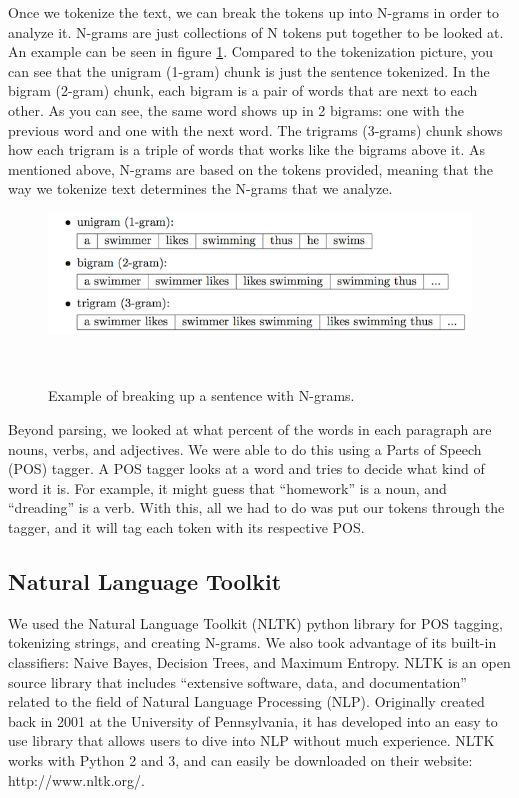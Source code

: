 Once we tokenize the text, we can break the tokens up into N-grams in order to analyze it. N-grams are just collections of N tokens put together to be looked at. An example can be seen in figure \ref{fig:ngrams}. Compared to the tokenization picture, you can see that the unigram (1-gram) chunk is just the sentence tokenized. In the bigram (2-gram) chunk, each bigram is a pair of words that are next to each other. As you can see, the same word shows up in 2 bigrams: one with the previous word and one with the next word. The trigrams (3-grams) chunk shows how each trigram is a triple of words that works like the bigrams above it. As mentioned above, N-grams are based on the tokens provided, meaning that the way we tokenize text determines the N-grams that we analyze.

\begin{figure}
\centering
\includegraphics[width=.7\columnwidth]{figures/ngram}
  \caption{Example of breaking up a sentence with N-grams. \cite{ngrams}}~\label{fig:ngrams}
\end{figure}

Beyond parsing, we looked at what percent of the words in each paragraph are nouns, verbs, and adjectives. We were able to do this using a Parts of Speech (POS) tagger. A POS tagger looks at a word and tries to decide what kind of word it is. For example, it might guess that ``homework'' is a noun, and ``dreading'' is a verb. With this, all we had to do was put our tokens through the tagger, and it will tag each token with its respective POS. 

\subsection{Natural Language Toolkit}
We used the Natural Language Toolkit (NLTK) python library for POS tagging, tokenizing strings, and creating N-grams. We also took advantage of its built-in classifiers: Naive Bayes, Decision Trees, and Maximum Entropy. NLTK is an open source library that includes ``extensive software, data, and documentation'' related to the field of Natural Language Processing (NLP).\cite{NLTK} Originally created back in 2001 at the University of Pennsylvania, it has developed into an easy to use library that allows users to dive into NLP without much experience. NLTK works with Python 2 and 3, and can easily be downloaded on their website: http://www.nltk.org/. \cite{NLTK}

